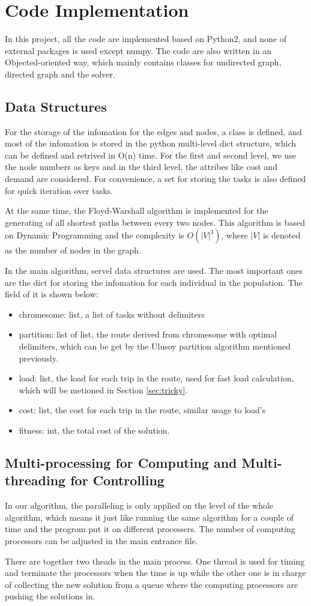 \documentclass[journal,twoside,web]{ieeecolor}
\begin{document}
\section{Code Implementation}
In this project, all the code are implemented based on Python2, and none of external packages is used except numpy. The code are also written in an Objected-oriented way, which mainly contains classes for undirected graph, directed graph and the solver.
\subsection{Data Structures}
For the storage of the infomation for the edges and nodes, a class is defined, and most of the infomation is stored in the python multi-level dict structure, which can be defined and retrived in O(n) time. For the first and second level, we use the node numbers as keys and in the third level, the attribes like cost and demand are considered. For convenience, a set for storing the tasks is also defined for quick iteration over tasks.
\par At the same time, the Floyd-Warshall algorithm is implemented for the generating of all shortest paths between every two nodes. This algorithm is based on Dynamic Programming and the complexity is $O(|V|^3)$, where $|V|$ is denoted as the number of nodes in the graph.
\par In the main algorithm, servel data structures are used. The most important ones are the dict for storing the infomation for each individual in the population. The field of it is shown below:
\begin{itemize}
\item chromesome: list, a list of tasks without delimiters
\item partition: list of list, the route derived from chromesome with optimal delimiters, which can be get by the Ulusoy partition algorithm mentioned previously.
\item load: list, the load for each trip in the route, used for fast load calculation, which will be metioned in Section \ref{sec:tricky}.
\item cost: list, the cost for each trip in the route, similar usage to load's
\item fitness: int, the total cost of the solution.
\end{itemize}
\subsection{Multi-processing for Computing and Multi-threading for Controlling}
In our algorithm, the paralleling is only applied on the level of the whole algorithm, which means it just like running the same algorithm for a couple of time and the progrom put it on different processers. The number of computing processors can be adjusted in the main entrance file.\par
There are together two theads in the main process. One thread is used for timing and terminate the processors when the time is up while the other one is in charge of collecting the new solution from a queue where the computing processors are pushing the solutions in.
\end{document}
